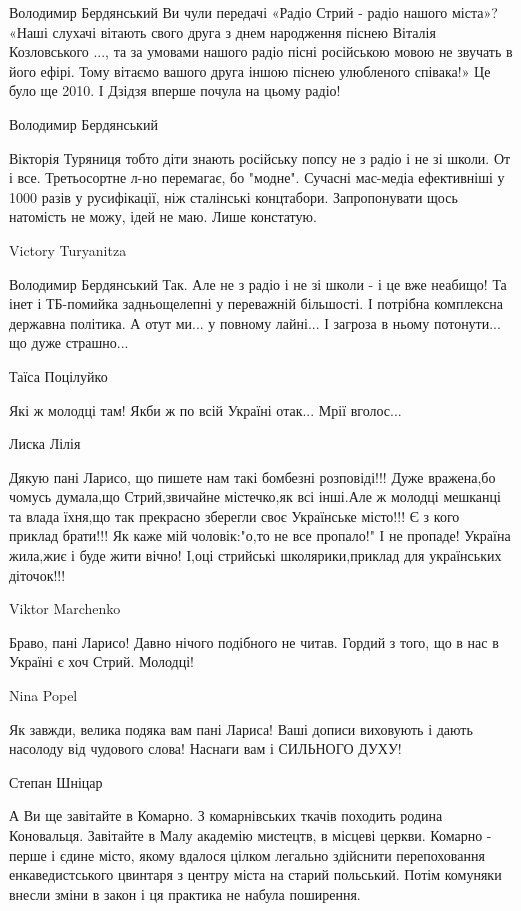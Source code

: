 Володимир Бердянський Ви чули передачі «Радіо Стрий - радіо нашого міста»?
«Наші слухачі вітають свого друга з днем народження піснею Віталія Козловського
..., та за умовами нашого радіо пісні російською мовою не звучать в його ефірі.
Тому вітаємо вашого друга іншою піснею улюбленого співака!» Це було ще 2010. І
Дзідзя вперше почула на цьому радіо!

Володимир Бердянський

Вікторія Туряниця тобто діти знають російську попсу не з радіо і не зі школи.
От і все. Третьосортне л-но перемагає, бо "модне". Сучасні мас-медіа
ефективніші у 1000 разів у русифікації, ніж сталінські концтабори.
Запропонувати щось натомість не можу, ідей не маю. Лише констатую.

Victory Turyanitza

Володимир Бердянський Так. Але не з радіо і не зі школи - і це вже неабищо! Та
інет і ТБ-помийка задньощелепні у переважній більшості. І потрібна комплексна
державна політика. А отут ми... у повному лайні... І загроза в ньому
потонути... що дуже страшно...

Таїса Поцілуйко

Які ж молодці там! Якби ж по всій Україні отак... Мрії вголос...

Лиска Лілія

Дякую пані Ларисо, що пишете нам такі бомбезні розповіді!!! Дуже вражена,бо
чомусь думала,що Стрий,звичайне містечко,як всі інші.Але ж молодці мешканці та
влада їхня,що так прекрасно зберегли своє Українське місто!!! Є з кого приклад
брати!!! Як каже мій чоловік:"о,то не все пропало!" І не пропаде! Україна
жила,жиє і буде жити вічно! І,оці стрийські школярики,приклад для українських
діточок!!!

Viktor Marchenko

Браво, пані Ларисо! Давно нічого подібного не читав. Гордий з того, що в нас в
Україні є хоч Стрий. Молодці!

Nina Popel

Як завжди, велика подяка вам пані Лариса! Ваші дописи виховують і дають
насолоду від чудового слова! Наснаги вам і СИЛЬНОГО ДУХУ!

Степан Шніцар

А Ви ще завітайте в Комарно. З комарнівських ткачів походить родина Коновальця.
Завітайте в Малу академію мистецтв, в місцеві церкви. Комарно - перше і єдине
місто, якому вдалося цілком легально здійснити перепоховання енкаведистського
цвинтаря з центру міста на старий польський. Потім комуняки внесли зміни в
закон і ця практика не набула поширення.


